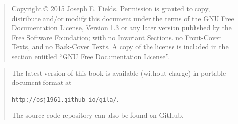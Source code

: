 \rule{0pt}{0pt}

\vfill

\begin{quote}
    Copyright \copyright{}  2015  Joseph E. Fields.
    Permission is granted to copy, distribute and/or modify this document
    under the terms of the GNU Free Documentation License, Version 1.3
    or any later version published by the Free Software Foundation;
    with no Invariant Sections, no Front-Cover Texts, and no Back-Cover Texts.
    A copy of the license is included in the section entitled ``GNU
    Free Documentation License''.
\end{quote}

\vfill

\begin{quote}
The latest version of this book is available (without charge) in portable document format at \newline
\rule{0pt}{0pt} \hspace{1in} \verb+http://osj1961.github.io/gila/+.  

\noindent The source code repository can also be found on GitHub.  


\end{quote}

\vfill
